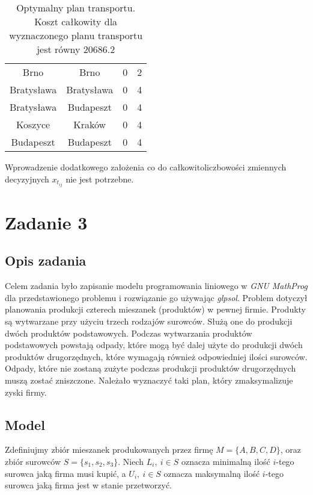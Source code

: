 \documentclass{article}
\begin{document}
\begin{table}[H]
\begin{center}
\begin{tabular}{c|c|c|c}
                    Brno  &  Brno  & 0  & 2  \\ 
                    Bratysława  &  Bratysława  & 0  & 4  \\ 
                    Bratysława  &  Budapeszt  & 0  & 4  \\ 
                    Koszyce  &  Kraków  & 0  & 4  \\ 
                    Budapeszt  &  Budapeszt  & 0  & 4  \\ 
                \end{tabular}
                \caption{Optymalny plan transportu. Koszt całkowity dla wyznaczonego planu transportu jest równy $20686.2$}
                \label{tab2}
            \end{center}
        \end{table}	    
    
        Wprowadzenie dodatkowego założenia co do całkowitoliczbowości zmiennych decyzyjnych $x_{t_{ij}}$ nie jest potrzebne.
    

    \section{Zadanie 3}
	\subsection{Opis zadania}

        Celem zadania było zapisanie modelu programowania liniowego w \textit{GNU MathProg} dla przedstawionego problemu i rozwiązanie go używając \textit{glpsol}. 
        Problem dotyczył planowania produkcji czterech mieszanek (produktów) w pewnej firmie. 
        Produkty są wytwarzane przy użyciu trzech rodzajów surowców. Służą one do produkcji dwóch produktów podstawowych. 
        Podczas wytwarzania produktów podstawowych powstają odpady, które mogą być dalej użyte do produkcji dwóch produktów drugorzędnych, 
        które wymagają również odpowiedniej ilości surowców. Odpady, które nie zostaną zużyte podczas produkcji produktów drugorzędnych muszą zostać 
        zniszczone.
        Należało wyznaczyć taki plan, który zmaksymalizuje zyski firmy.
    
    \subsection{Model}

        Zdefiniujmy zbiór mieszanek produkowanych przez firmę $M = \{A, B, C, D\}$, oraz zbiór surowców $S = \{s_1, s_2, s_3\}$.
        Niech $L_i, \ i \in S$ oznacza minimalną ilość $i$-tego surowca jaką firma musi kupić, a $U_i, \ i \in S$ oznacza maksymalną 
        ilość $i$-tego surowca jaką firma jest w stanie przetworzyć.
\end{document}
